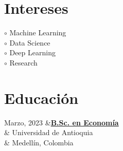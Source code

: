 \documentclass[a3paper,11pt]{article}
\begin{document}
\begin{adjustbox}{valign=t}
\begin{minipage}{0.3\textwidth}
\section*{Intereses}
\raggedright
\textcolor{ColorOne}{$\circ$} Machine Learning\\
\textcolor{ColorOne}{$\circ$} Data Science\\
\textcolor{ColorOne}{$\circ$} Deep Learning\\
\textcolor{ColorOne}{$\circ$} Research

\vfill

\section*{Educación}
\begin{tblr}{}
	\normalfont \textcolor{ColorOne}{Marzo, 2023} &{\hypersetup{urlcolor=black}\href{https://github.com/AlRamirezRe/Resume-Documents/blob/master/ACTA-HV1152210514.pdf}{\textbf{B.Sc. en
Economía}}}  \\
        &  Universidad de Antioquia \\
        &  Medellín, Colombia\\
\end{tblr}


\vfill
\end{minipage}
\end{adjustbox}
\end{document}

